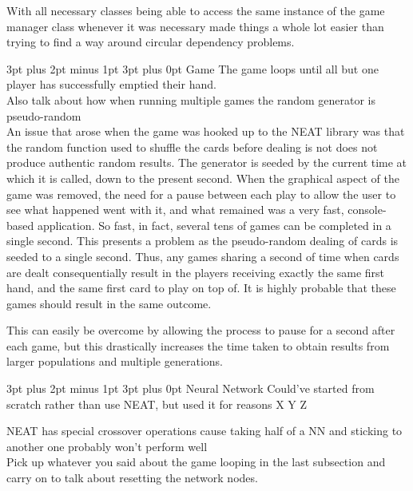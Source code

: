 \documentclass[12pt,a4paper]{article}
\makeatletter
\renewcommand\subsection{\@startsection {subsection}{1}{2mm} %
                               {3pt plus 2pt minus 1pt} %
                               {3pt plus 0pt} %
                               {\normalfont\bfseries}}
\makeatother
\begin{document}
With all necessary classes being able to access the same instance of the game manager class whenever it was necessary made things a whole lot easier than trying to find a way around circular dependency problems. 

\subsection{Game}
The game loops until all but one player has successfully emptied their hand. \\

Also talk about how when running multiple games the random generator is pseudo-random\\

An issue that arose when the game was hooked up to the NEAT library was that the random function used to shuffle the cards before dealing is not does not produce authentic random results. The generator is seeded by the current time at which it is called, down to the present second. When the graphical aspect of the game was removed, the need for a pause between each play to allow the user to see what happened went with it, and what remained was a very fast, console-based application. So fast, in fact, several tens of games can be completed in a single second. This presents a problem as the pseudo-random dealing of cards is seeded to a single second. Thus, any games sharing a second of time when cards are dealt consequentially result in the players receiving exactly the same first hand, and the same first card to play on top of. It is highly probable that these games should result in the same outcome. 

This can easily be overcome by allowing the process to pause for a second after each game, but this drastically increases the time taken to obtain results from larger populations and multiple generations. 


\subsection{Neural Network}
Could've started from scratch rather than use NEAT, but used it for reasons X Y Z

NEAT has special crossover operations cause taking half of a NN and sticking to another one probably won't perform well \\


Pick up whatever you said about the game looping in the last subsection and carry on to talk about resetting the network nodes.\\
\end{document}
